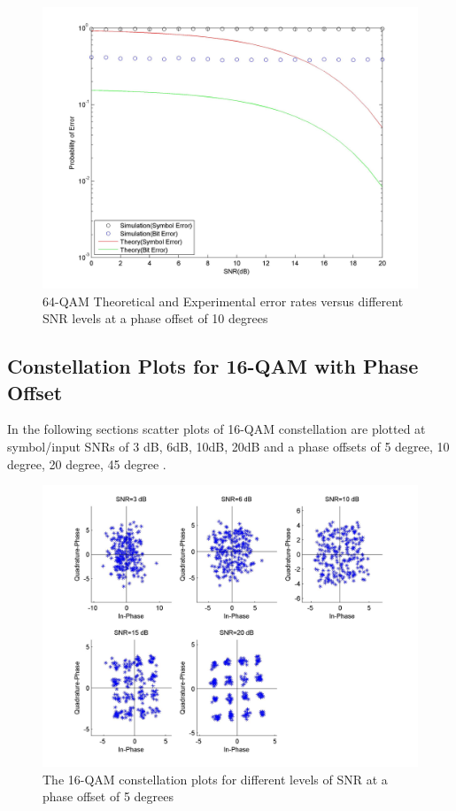 \documentclass[]{article}
\begin{document}
\begin{figure}[H]
\centering
\hspace*{-2cm}\includegraphics[width=1.3\textwidth]{qam64SNRpo4.jpg}
\caption{64-QAM Theoretical and Experimental error rates versus different SNR levels at a phase offset of 10 degrees }
\end{figure}

\subsection{Constellation Plots for 16-QAM with Phase Offset}
\label{sec:qam16_phaseConst}
In the following sections scatter plots of  16-QAM constellation are plotted at symbol/input SNRs of 3 dB, 6dB, 10dB, 20dB and a phase offsets of 5 degree, 10 degree, 20 degree, 45 degree .

\begin{figure}[H]
\centering
\hspace*{-2cm}\includegraphics[width=1.3\textwidth]{qam16Constpo1.jpg}
\caption{The 16-QAM constellation plots for different levels of SNR at a phase offset of 5 degrees}
\end{figure}
\end{document}
